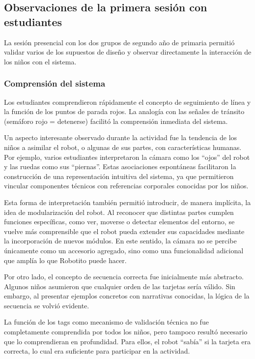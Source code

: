 \documentclass{prgrado}
\begin{document}
\subsection{Observaciones de la primera sesión con estudiantes}
La sesión presencial con los dos grupos de segundo año de primaria permitió validar varios de los supuestos de diseño y observar directamente la interacción de los niños con el sistema.
\subsubsection{Comprensión del sistema}
Los estudiantes comprendieron rápidamente el concepto de seguimiento de línea y la función de los puntos de parada rojos. La analogía con las señales de tránsito (semáforo rojo = detenerse) facilitó la comprensión inmediata del sistema.

Un aspecto interesante observado durante la actividad fue la tendencia de los niños a asimilar el robot, o algunas de sus partes, con características humanas. Por ejemplo, varios estudiantes interpretaron la cámara como los ``ojos'' del robot y las ruedas como sus ``piernas''. Estas asociaciones espontáneas facilitaron la construcción de una representación intuitiva del sistema, ya que permitieron vincular componentes técnicos con referencias corporales conocidas por los niños.

Esta forma de interpretación también permitió introducir, de manera implícita, la idea de modularización del robot. Al reconocer que distintas partes cumplen funciones específicas, como ver, moverse o detectar elementos del entorno, se vuelve más comprensible que el robot pueda extender sus capacidades mediante la incorporación de nuevos módulos. En este sentido, la cámara no se percibe únicamente como un accesorio agregado, sino como una funcionalidad adicional que amplía lo que Robotito puede hacer.

Por otro lado, el concepto de secuencia correcta fue inicialmente más abstracto. Algunos niños asumieron que cualquier orden de las tarjetas sería válido. Sin embargo, al presentar ejemplos concretos con narrativas conocidas, la lógica de la secuencia se volvió evidente.

La función de los tags como mecanismo de validación técnica no fue completamente comprendida por todos los niños, pero tampoco resultó necesario que lo comprendieran en profundidad. Para ellos, el robot ``sabía'' si la tarjeta era correcta, lo cual era suficiente para participar en la actividad.
\end{document}
